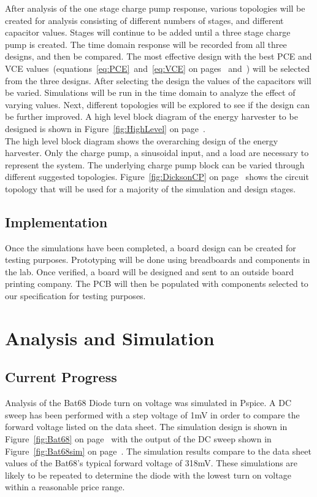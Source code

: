 \documentclass[12pt]{article}
\begin{document}
	\noindent After analysis of the one stage charge pump response, various topologies will be created for analysis consisting of different numbers of stages, and different capacitor values. Stages will continue to be added until a three stage charge pump is created. The time domain response will be recorded from all three designs, and then be compared. The most effective design with the best PCE and VCE values~(equations~\ref{eq:PCE}~and~\ref{eq:VCE} on pages~\pageref{eq:PCE} and~\pageref{eq:VCE}) will be selected from the three designs. After selecting the design the values of the capacitors will be varied. Simulations will be run in the time domain to analyze the effect of varying values. Next, different topologies will be explored to see if the design can be further improved. A high level block diagram of the energy harvester to be designed is shown in Figure~\ref{fig:HighLevel} on page~\pageref{fig:HighLevel}.\\

\noindent The high level block diagram shows the overarching design of the energy harvester. Only the charge pump, a sinusoidal input, and a load are necessary to represent the system. The underlying charge pump block can be varied through different suggested topologies. Figure~\ref{fig:DicksonCP}  on page~\pageref{fig:DicksonCP} shows the circuit topology that will be used for a majority of the simulation and design stages.

	\subsection{Implementation}
	Once the simulations have been completed, a board design can be created for testing purposes. Prototyping will be done using breadboards and components in the lab. Once verified, a board will be designed and sent to an outside board printing company. The PCB will then be populated with components selected to our specification for testing purposes.
	
	\section{Analysis and Simulation}
	
	\subsection{Current Progress}
Analysis of the Bat68 Diode turn on voltage was simulated in Pspice. A DC sweep has been performed with a step voltage of 1mV in order to compare the forward voltage listed on the data sheet. The simulation design is shown in Figure~\ref{fig:Bat68} on page~\pageref{fig:Bat68} with the output of the DC sweep shown in Figure~\ref{fig:Bat68sim} on page~\pageref{fig:Bat68sim}. The simulation results compare to the data sheet values of the Bat68's typical forward voltage of 318mV. These simulations are likely to be repeated to determine the diode with the lowest turn on voltage within a reasonable price range.
\end{document}
